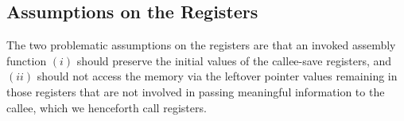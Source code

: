 


\subsection{Assumptions on the Registers}
\label{sec:overview-semantics-register}
%
The two problematic assumptions on the registers are that
an invoked assembly function $(i)$ should
preserve the initial values of the callee-save registers, and $(ii)$
should not access the memory via the leftover pointer values remaining
in those registers that are not involved in passing meaningful information to the callee,
which we henceforth call \emph{\nip{}} registers.

